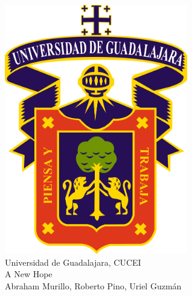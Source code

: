 \documentclass{article} %
\begin{document}
  

\pagestyle{empty}
  \begin{center}
    \strut %
    \includegraphics[width=8cm]{udg.png} \\
    {\Huge Universidad de Guadalajara, CUCEI\\}
    {\fontsize{60}{60}\selectfont A New Hope\\}
    \vspace{0.5cm}
    {\Large Abraham Murillo, Roberto Pino, Uriel Guzmán\\}
    \vfill
    \vspace{0.5cm}
    \vspace{1cm}
  \end{center}
\clearpage
\pagestyle{fancy}
  
\end{document}
